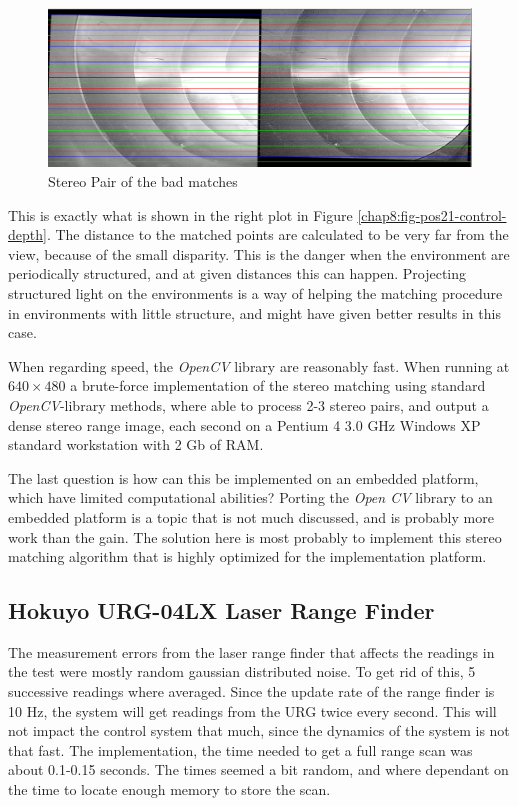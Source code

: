 \begin{figure}[htbp]
    \centering
    \includegraphics[width=\textwidth]{pics/pos21-control-rectified}
    \caption{Stereo Pair of the bad matches}
    \label{chap8:fig-pos21-control-rectified}
\end{figure}
This is exactly what is shown in the right plot in Figure
\ref{chap8:fig-pos21-control-depth}. The distance to the matched points are calculated to
be very far from the view, because of the small disparity. This is the danger when the
environment are periodically structured, and at given distances this can happen.
Projecting structured light on the environments is a way of helping the matching procedure
in environments with little structure, and might have given better results in this case. 

When regarding speed, the \emph{OpenCV} library are reasonably fast. When running at
$640\times480$ a brute-force implementation of the stereo matching using standard
\emph{OpenCV}-library methods, where able to process 2-3 stereo pairs, and
output a dense stereo range image, each second on a Pentium 4 3.0 GHz Windows XP 
standard workstation with 2 Gb of RAM. 

The last question is how can this be implemented on an embedded platform, which have limited
computational abilities? Porting the \emph{Open CV} library to an embedded platform is a
topic that is not much discussed, and is probably more work than the gain. The solution
here is most probably to implement this stereo matching algorithm that is highly optimized
for the implementation platform. 




\subsection{Hokuyo URG-04LX Laser Range Finder}
The measurement errors from the laser range finder that affects the readings in the test were
mostly random gaussian distributed noise. To get rid of this, 5 successive
readings where averaged. Since the update rate of the range finder is 10 Hz, the system
will get readings from the URG twice every second. This will not impact the control system
that much, since the dynamics of the system is not that fast. The implementation, the time
needed to get a full range scan was about 0.1-0.15 seconds. The times seemed a bit random,
and where dependant on the time to locate enough memory to store the scan. 

